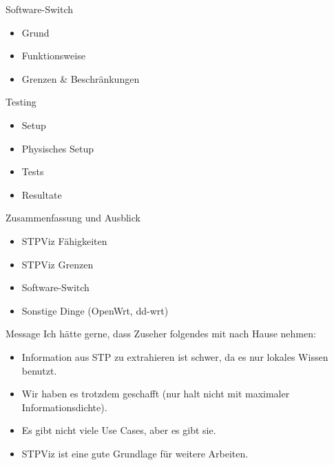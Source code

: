 \documentclass{beamer}
\begin{document}
\begin{frame}{Software-Switch}
    \begin{itemize}
        \item Grund
        \item Funktionsweise
        \item Grenzen \& Beschränkungen
    \end{itemize}
\end{frame}

\begin{frame}{Testing}
    \begin{itemize}
        \item Setup
        \item Physisches Setup
        \item Tests
        \item Resultate
    \end{itemize}
\end{frame}

\begin{frame}{Zusammenfassung und Ausblick}
    \begin{itemize}
        \item STPViz Fähigkeiten
        \item STPViz Grenzen
        \item Software-Switch
        \item Sonstige Dinge (OpenWrt, dd-wrt)
    \end{itemize}
\end{frame}

\begin{frame}{Message}
Ich hätte gerne, dass Zuseher folgendes mit nach Hause nehmen:\\
\begin{itemize}
    \item Information aus STP zu extrahieren ist schwer, da es nur lokales Wissen benutzt.
    \item Wir haben es trotzdem geschafft (nur halt nicht mit maximaler Informationsdichte).
    \item Es gibt nicht viele Use Cases, aber es gibt sie.
    \item STPViz ist eine gute Grundlage für weitere Arbeiten.
\end{itemize}
\end{frame}
\end{document}
